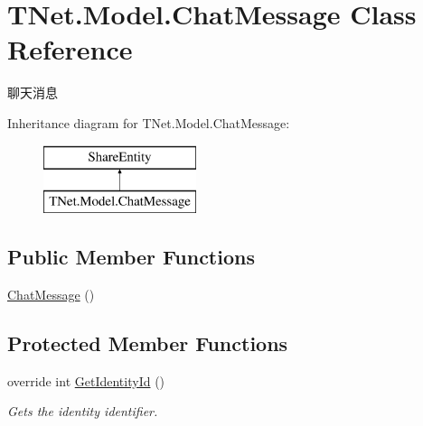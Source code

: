 \hypertarget{class_t_net_1_1_model_1_1_chat_message}{}\section{T\+Net.\+Model.\+Chat\+Message Class Reference}
\label{class_t_net_1_1_model_1_1_chat_message}


聊天消息  


Inheritance diagram for T\+Net.\+Model.\+Chat\+Message\+:\begin{figure}[H]
\begin{center}
\leavevmode
\includegraphics[height=2.000000cm]{class_t_net_1_1_model_1_1_chat_message}
\end{center}
\end{figure}
\subsection*{Public Member Functions}
\begin{DoxyCompactItemize}
\item 
\mbox{\hyperlink{class_t_net_1_1_model_1_1_chat_message_a5973062b1fb62f7da9d61af087301cfd}{Chat\+Message}} ()
\end{DoxyCompactItemize}
\subsection*{Protected Member Functions}
\begin{DoxyCompactItemize}
\item 
override int \mbox{\hyperlink{class_t_net_1_1_model_1_1_chat_message_ac14619162fa7fc59812cf05b255a692b}{Get\+Identity\+Id}} ()
\begin{DoxyCompactList}\small\item\em Gets the identity identifier. \end{DoxyCompactList}\end{DoxyCompactItemize}
